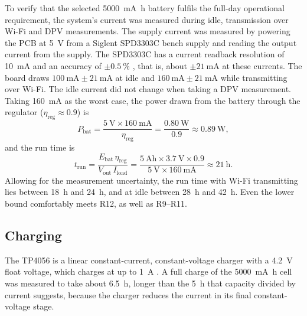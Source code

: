 To verify that the selected \SI{5000}{\milli\ampere\hour} battery fulfils the full-day operational requirement, the system's current was measured during idle, transmission over Wi-Fi and DPV measurements. The supply current was measured by powering the PCB at \SI{5}{\volt} from a Siglent SPD3303C bench supply and reading the output current from the supply. The SPD3303C has a current
readback resolution of \SI{10}{\milli\ampere} and an accuracy of
$\pm\SI{0.5}{\percent}$
\cite{siglent_spd3303c}, that is, about $\pm\SI{21}{\milli\ampere}$ at these
currents. The board draws $\SI{100}{\milli\ampere} \pm \SI{21}{\milli\ampere}$
at idle and $\SI{160}{\milli\ampere} \pm \SI{21}{\milli\ampere}$ while
transmitting over Wi-Fi. The idle current did not change when taking a DPV measurement. Taking \SI{160}{\milli\ampere} as the worst case, the power drawn from the
battery through the regulator ($\eta_\text{reg} \approx 0.9$) is
\begin{equation}
  P_\text{bat} = \frac{\SI{5}{\volt} \times \SI{160}{\milli\ampere}}
                      {\eta_\text{reg}}
               = \frac{\SI{0.80}{\watt}}{0.9}
               \approx \SI{0.89}{\watt},
  \label{eq:hw_pbat}
\end{equation}
and the run time is
\begin{equation}
  t_\text{run} = \frac{E_\text{bat}\,\eta_\text{reg}}{V_\text{out}\,I_\text{load}}
    = \frac{\SI{5}{\ampere\hour} \times \SI{3.7}{\volt} \times 0.9}
           {\SI{5}{\volt} \times \SI{160}{\milli\ampere}}
    \approx \SI{21}{\hour}.
  \label{eq:hw_runtime}
\end{equation}
Allowing for the measurement uncertainty, the run time with Wi-Fi
transmitting lies between \SI{18}{\hour} and \SI{24}{\hour}, and at idle
between \SI{28}{\hour} and \SI{42}{\hour}. Even the lower bound comfortably
meets R12, as well as R9--R11.

\subsection{Charging}
\label{sec:hw_charging}

The TP4056 is a linear constant-current, constant-voltage charger with a
\SI{4.2}{\volt} float voltage, which charges at up to \SI{1}{\ampere} \cite{tp4056_ds}. A full charge of the \SI{5000}{\milli\ampere\hour} cell was measured to take about \SI{6.5}{\hour}, longer than the \SI{5}{\hour} that capacity divided by current suggests, because the charger reduces the current in its final constant-voltage stage.

